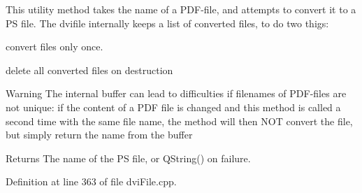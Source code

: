 This utility method takes the name of a P\+D\+F-\/file, and attempts to convert it to a P\+S file. The dvifile internally keeps a list of converted files, to do two thigs\+:


\begin{DoxyItemize}
\item convert files only once.
\item delete all converted files on destruction
\end{DoxyItemize}

\begin{DoxyWarning}{Warning}
The internal buffer can lead to difficulties if filenames of P\+D\+F-\/files are not unique\+: if the content of a P\+D\+F file is changed and this method is called a second time with the same file name, the method will then N\+O\+T convert the file, but simply return the name from the buffer
\end{DoxyWarning}
\begin{DoxyReturn}{Returns}
The name of the P\+S file, or Q\+String() on failure. 
\end{DoxyReturn}


Definition at line 363 of file dvi\+File.\+cpp.


